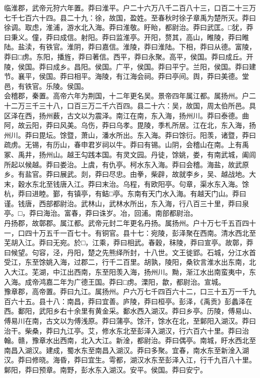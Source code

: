 \documentclass[]{article}
\begin{document}
临淮郡，武帝元狩六年置。莽曰淮平。户二十六万八千二百八十三，口百二十三万七千七百六十四。县二十九：徐，故国，盈姓。至春秋时徐子章禹为楚所灭。莽曰徐调。取虑，淮浦，游水北入海。莽曰淮敬。盱眙，都尉治。莽曰武匡。□犹，莽曰秉义。僮，莽曰成信。射阳。莽曰监淮亭。开阳，赘其，高山，睢陵，莽曰睢陆。盐渎，有铁官。淮阴，莽曰嘉信。淮陵，莽曰淮陆。下相，莽曰从德。富陵，莽曰□虏。东阳，播旌，莽曰著信。西平，莽曰永聚。高平，侯国。莽曰成丘。开陵，侯国。莽曰成乡。昌阳。侯国。广平，侯国。莽曰平宁。兰阳，侯国。莽曰建节。襄平，侯国。莽曰相平。海陵，有江海会祠。莽曰亭间。舆，莽曰美德。堂邑，有铁官。乐陵。侯国。\\
会稽郡，秦置。高帝六年为荆国，十二年更名吴。景帝四年属江都。属扬州。户二十二万三千三十八，口百三万二千六百四。县二十六：吴，故国，周太伯所邑。具区泽在西，扬州薮，古文以为震泽。南江在南，东入海，扬州川。莽曰泰德。曲阿，故云阳，莽曰风美。乌伤，莽曰乌孝。毘陵，季札所居。江在北，东入海，扬州川。莽曰毘坛。馀暨，萧山，潘水所出。东入海。莽曰馀衍。阳羡，诸暨，莽曰疏虏。无锡，有历山，春申君岁祠以牛。莽曰有锡。山阴，会稽山在南。上有禹冢、禹井，扬州山。越王勾践本国。有灵文园。丹徒，馀姚，娄，有南武城，阖闾所起以候越。莽曰娄治。上虞，有仇亭。柯水东入海。莽曰会稽。海盐，故武原乡。有盐官。莽曰展武。剡，莽曰尽忠。由拳，柴辟，故就李乡，吴、越战地。大末，穀水东北至钱唐入江。莽曰末治。乌程，有欧阳亭。句章，渠水东入海。馀杭，莽曰进睦。鄞，有镇亭，有鲒□亭。东南有天门水入海。有越天门山。莽曰谨。钱唐，西部都尉治。武林山，武林水所出，东入海，行八百三十里，莽曰泉亭。□，莽曰海治。富春，莽曰诛岁。冶，回浦。南部都尉治。\\
丹扬郡，故鄣郡。属江都。武帝元封二年更名丹扬。属扬州。户十万七千五百四十一，口四十万五千一百七十。有铜官。县十七：宛陵，彭泽聚在西南。清水西北至芜胡入江。莽曰无宛。於□，江乘，莽曰相武。春穀，秣陵，莽曰宣亭。故鄣，莽曰候望。句容，泾，丹阳，楚之先熊绎所封，十八世。文王徙郢。石城，分江水首受江，东至馀姚入海，过郡二，行千二百里。胡孰，陵阳，桑钦言淮水出东南，北入大江。芜湖，中江出西南，东至阳羡入海，扬州川。黝，渐江水出南蛮夷中，东入海。成帝鸿嘉二年为广德王国。莽曰□虏。溧阳，歙，都尉治。宣城。\\
豫章郡，高帝置。莽曰九江。属扬州。户六万七千四百六十二，口三十五万一千九百六十五。县十八：南昌，莽曰宜善。庐陵，莽曰桓亭。彭泽，《禹贡》彭蠡泽在西。鄱阳，武阳乡右十余里有黄金采。鄱水西入湖汉。莽曰乡亭。历陵，傅易山、傅易川在南，古文以为傅浅原。莽曰蒲亭。馀汗，馀水在北，至鄡阳入湖汉。莽曰治干。柴桑，莽曰九江亭。艾，修水东北至彭泽入湖汉，行六百六十里。莽曰治翰。赣，豫章水出西南，北入大江。新淦，都尉治。莽曰偶亭。南城，盱水西北至南昌入湖汉。建成，蜀水东至南昌入湖汉。莽曰多聚。宜春，南水东至新淦入湖汉。莽曰修晓。海昏，莽曰宜生。雩都，湖汉水东至彭泽入江，行千九百八十里。鄡阳，莽曰预章。南野，彭水东入湖汉。安平。侯国。莽曰安宁。\\
\end{document}
